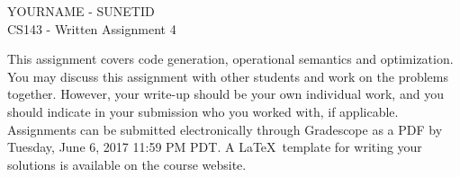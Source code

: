 \documentclass[11pt]{article}
\begin{document}
\begin{center}
\LARGE YOURNAME - SUNETID \\
\Large CS143 - Written Assignment 4
\end{center}


This assignment covers code generation, operational semantics and optimization. You may discuss this assignment with other students and work on the problems together. However, your write-up should be your own individual work, and you should indicate in your submission who you worked with, if applicable. Assignments can be submitted electronically through Gradescope as a PDF by Tuesday, June 6, 2017 11:59 PM PDT. A \LaTeX \ template for writing your solutions is available on the course website.
\end{document}
